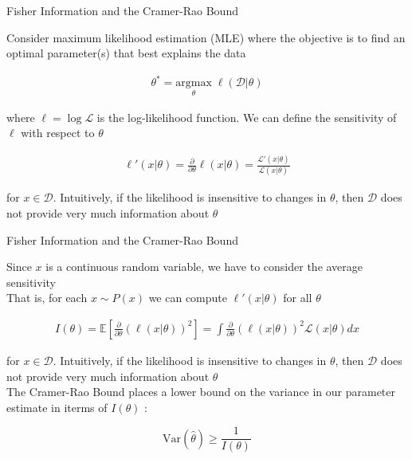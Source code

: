 \documentclass[aspectratio=1610]{beamer}					%
\begin{document}
\begin{frame}{Fisher Information and the Cramer-Rao Bound}

Consider maximum likelihood estimation (MLE) where the objective is to find an optimal parameter(s) that best explains the data

\begin{align*}
\theta^{*} = \underset{\theta}{\mathrm{argmax}}\; \ell(\mathcal{D}|\theta)
\end{align*}

where $\ell = \log\mathcal{L}$ is the log-likelihood function. We can define the sensitivity of $\ell$ with respect to $\theta$

\begin{align*}
\ell'(x|\theta) = \frac{\partial}{\partial\theta} \ell(x|\theta) = \frac{\mathcal{L}'(x|\theta)}{\mathcal{L}(x|\theta)}
\end{align*}

for $x\in\mathcal{D}$. Intuitively, if the likelihood is insensitive to changes in $\theta$, then $\mathcal{D}$ does not provide very much information about $\theta$

\end{frame}

\begin{frame}{Fisher Information and the Cramer-Rao Bound}

Since $x$ is a continuous random variable, we have to consider the average sensitivity\\
\vspace{0.2in}
That is, for each $x\sim P(x)$ we can compute $\ell'(x|\theta)$ for all $\theta$

\begin{align*}
I(\theta) = \mathbb{E}\left[\frac{\partial}{\partial\theta} \left(\ell(x|\theta)\right)^{2}\right] = \int \frac{\partial}{\partial\theta}\left(\ell(x|\theta)\right)^{2} \mathcal{L}(x|\theta)dx
\end{align*}

for $x\in\mathcal{D}$. Intuitively, if the likelihood is insensitive to changes in $\theta$, then $\mathcal{D}$ does not provide very much information about $\theta$\\
\vspace{0.1in}
The Cramer-Rao Bound places a lower bound on the variance in our parameter estimate in iterms of $I(\theta)$ :

\begin{equation*}
\mathrm{Var}(\hat{\theta}) \geq \frac{1}{I(\theta)}
\end{equation*}

\end{frame}
\end{document}

